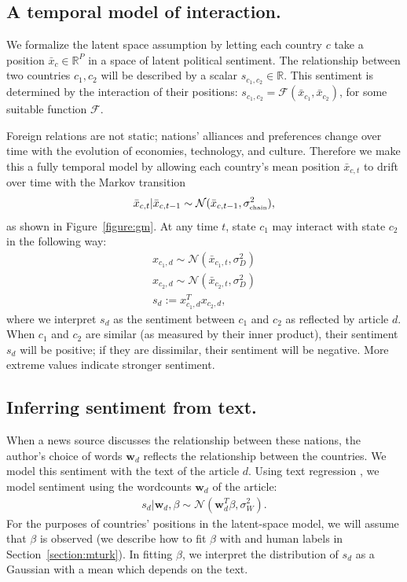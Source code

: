 \subsection{A temporal model of interaction.}
We formalize the latent space assumption by letting each country $c$
take a position $\bar x_c \in \mathbb{R}^P$ in a space of latent
political sentiment. The relationship between two countries $c_1, c_2$
will be described by a scalar $s_{c_1,c_2} \in \mathbb{R}$.  This
sentiment is determined by the interaction of their positions:
$s_{c_1, c_2} = \mathcal{F}(\bar x_{c_1}, \bar x_{c_2})$, for some
suitable function $\mathcal{F}$.

Foreign relations are not static; nations' alliances and preferences
change over time with the evolution of economies, technology, and
culture.  Therefore we make this a fully temporal model by
allowing each country's mean position $\bar x_{c,t}$ to drift over
time with the Markov transition
\begin{align}
  \bar x_{c,t} | \bar x_{c,t-1} \sim \mathcal{N}(\bar x_{c,t-1}, \sigma_{\mbox{\tiny chain}}^2),
\end{align}
as shown in Figure~\ref{figure:gm}. At any time $t$, state $c_1$ may interact with state $c_2$ in the following way:
\begin{align}
  x_{c_1,d} \sim \mathcal{N}(\bar x_{c_1, t}, \sigma_D^2) \nonumber \\
  x_{c_2,d} \sim \mathcal{N}(\bar x_{c_2, t}, \sigma_D^2) \nonumber \\
  s_d := x_{c_1,d}^T x_{c_2,d}, \label{eq:sentiment_space}
\end{align}
where we interpret $s_d$ as the sentiment between $c_1$ and $c_2$ as
reflected by article $d$.  When $c_1$ and $c_2$ are similar (as
measured by their inner product), their sentiment $s_d$ will be
positive; if they are dissimilar, their sentiment will be negative.
More extreme values indicate stronger sentiment.

\subsection{Inferring sentiment from text.}
\label{section:text_regression}
When a news source discusses the relationship between these nations,
the author's choice of words $\bm w_d$ reflects the relationship
between the countries.  We model this sentiment with the text of the
article $d$.  Using text regression \cite{kogan:2009}, we model
sentiment using the wordcounts $\bm w_d$ of the article:
\begin{align}
  s_d | \bm w_d, \beta \sim \mathcal{N}( \bm w_d^T \beta, \sigma_W^2 ).
  \label{eq:sentiment_text}
\end{align}
For the purposes of countries' positions in the latent-space model, we
will assume that $\beta$ is observed (we describe how to fit $\beta$
with  and human labels in
Section~\ref{section:mturk}).  In fitting $\beta$, we interpret the
distribution of $s_d$ as a Gaussian with a mean which depends on the
text.

